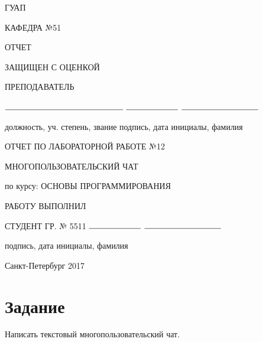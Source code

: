 \documentclass{article}
\begin{document}
\begin{titlepage}
	\begin{center}
    	ГУАП
    	\vspace{0.25cm}

    	КАФЕДРА №51
	\end{center}

    \begin{flushleft}

    	ОТЧЕТ

    	ЗАЩИЩЕН С ОЦЕНКОЙ

		ПРЕПОДАВАТЕЛЬ 


    	\vspace{0.5cm} 

		$\rule{5cm}{0.15mm}$ \hfill $\rule{2.2cm}{0.15mm}$  \hfill $\rule{3.25cm}{0.15mm}$

		должность, уч. степень, звание \hfill подпись, дата \hfill инициалы, фамилия
    \end{flushleft}
    
 	
    \hspace{2cm}

	\begin{center}
    	ОТЧЕТ ПО ЛАБОРАТОРНОЙ РАБОТЕ №12


    	\vspace{1cm}

    	МНОГОПОЛЬЗОВАТЕЛЬСКИЙ ЧАТ


    	\vspace{1cm}

    	по курсу: ОСНОВЫ ПРОГРАММИРОВАНИЯ {\MakeUppercase{}}
    \end{center}

    \vspace{3cm}

    \begin{flushleft}
    	РАБОТУ ВЫПОЛНИЛ

    	СТУДЕНТ ГР. № 5511 \hfill $\rule{2.2cm}{0.15mm}$  \hfill $\rule{3.25cm}{0.15mm}$

    	\hspace{7.8cm} подпись, дата \hfill инициалы, фамилия
    \end{flushleft}

	\vspace{5cm}   
	\begin{center}
 		Санкт-Петербург 2017
	\end{center}
\end{titlepage}

\section{Задание}
Написать текстовый многопользовательский чат. 
\end{document}
